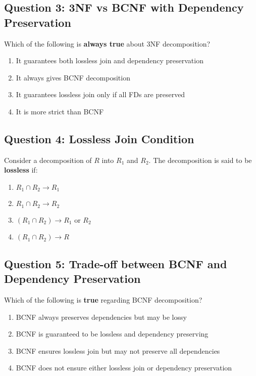 \vspace{1em}

\subsection*{Question 3: 3NF vs BCNF with Dependency Preservation}
Which of the following is \textbf{always true} about 3NF decomposition?

\begin{enumerate}[label=(\alph*)]
    \item It guarantees both lossless join and dependency preservation
    \item It always gives BCNF decomposition
    \item It guarantees lossless join only if all FDs are preserved
    \item It is more strict than BCNF
\end{enumerate}

\vspace{1em}

\subsection*{Question 4: Lossless Join Condition}
Consider a decomposition of $R$ into $R_1$ and $R_2$. The decomposition is said to be \textbf{lossless} if:

\begin{enumerate}[label=(\alph*)]
    \item $R_1 \cap R_2 \rightarrow R_1$
    \item $R_1 \cap R_2 \rightarrow R_2$
    \item $(R_1 \cap R_2) \rightarrow R_1$ or $R_2$
    \item $(R_1 \cap R_2) \rightarrow R$
\end{enumerate}

\vspace{1em}

\subsection*{Question 5: Trade-off between BCNF and Dependency Preservation}
Which of the following is \textbf{true} regarding BCNF decomposition?

\begin{enumerate}[label=(\alph*)]
    \item BCNF always preserves dependencies but may be lossy
    \item BCNF is guaranteed to be lossless and dependency preserving
    \item BCNF ensures lossless join but may not preserve all dependencies
    \item BCNF does not ensure either lossless join or dependency preservation
\end{enumerate}
\newpage
